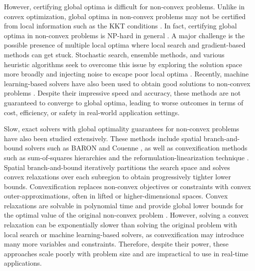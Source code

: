 \documentclass[10pt]{article} %
\theoremstyle{plain}
\theoremstyle{definition}
\theoremstyle{remark}
\begin{document}
However, certifying global optima is difficult for non-convex problems. Unlike in convex optimization, global optima in non-convex problems may not be certified from local information such as the KKT conditions \citep{boyd2004convex}. In fact, certifying global optima in non-convex problems is NP-hard in general \citep{murty1985some}. 
A major challenge is the possible presence of multiple local optima where local search and gradient-based methods can get stuck. Stochastic search, ensemble methods, and various heuristic algorithms seek to overcome this issue by exploring the solution space more broadly and injecting noise to escape poor local optima \citep{dauphin2014identifying, kumar2020test}. Recently, machine learning-based solvers have also been used to obtain good solutions to non-convex problems \citep{donti2021dc3, jiang2024advancements}. Despite their impressive speed and accuracy, these methods are not guaranteed to converge to global optima, leading to worse outcomes in terms of cost, efficiency, or safety in real-world application settings.

Slow, exact solvers with global optimality guarantees for non-convex problems have also been studied extensively. These methods include spatial branch-and-bound solvers such as BARON and Couenne \citep{tawarmalani2005polyhedral, belotti2009branching}, as well as convexification methods such as sum-of-squares hierarchies and the reformulation-linearization technique \citep{lasserre2001global, ahmadi2019dsos, rudi2020finding, sherali2013reformulation}. Spatial branch-and-bound iteratively partitions the search space and solves convex relaxations over each subregion to obtain progressively tighter lower bounds. Convexification replaces non-convex objectives or constraints with convex outer-approximations, often in lifted or higher-dimensional spaces. Convex relaxations are solvable in polynomial time and provide global lower bounds for the optimal value of the original non-convex problem \citep{boyd2004convex}.
However, solving a convex relaxation can be exponentially slower than solving the original problem with local search or machine learning-based solvers, as convexification may introduce many more variables and constraints. Therefore, despite their power, these approaches scale poorly with problem size and are impractical to use in real-time applications.
\end{document}
